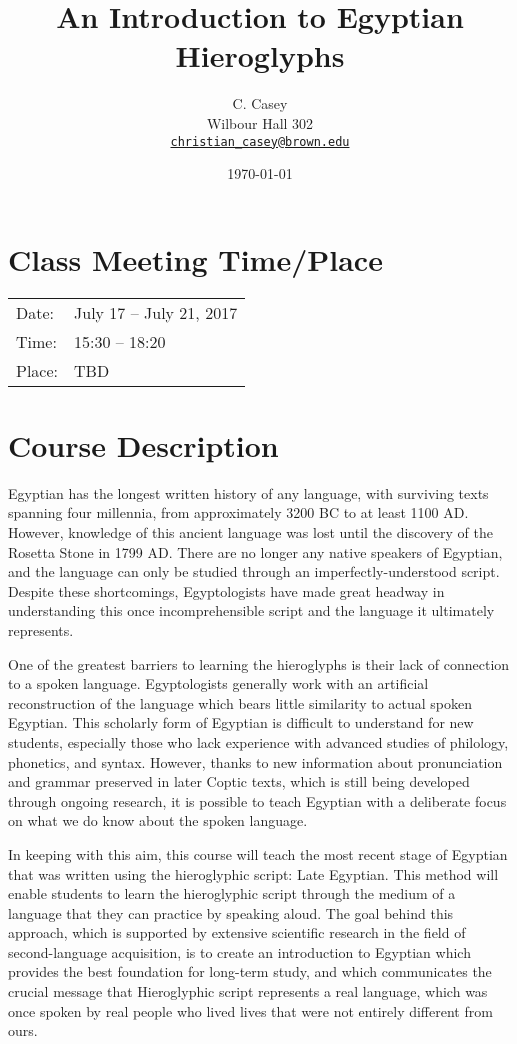 \documentclass[11pt]{article}
\begin{document}
	
	\title{An Introduction to Egyptian Hieroglyphs}
	\author{C. Casey \\
		Wilbour Hall 302 \\
  		\texttt{\href{mailto:christian_casey@brown.edu}{christian\_casey@brown.edu}}}
	\date{\today}
	\maketitle
	
	\section*{Class Meeting Time/Place}
	
		\begin{tabular}{l l}
		Date: & July 17 – July 21, 2017 \\
		Time: & 15:30 – 18:20 \\
		Place: & TBD
		\end{tabular} 
		
	\section*{Course Description}
		Egyptian has the longest written history of any language, with surviving texts spanning four millennia, from approximately 3200 BC to at least 1100 AD. However, knowledge of this ancient language was lost until the discovery of the Rosetta Stone in 1799 AD. There are no longer any native speakers of Egyptian, and the language can only be studied through an imperfectly-understood script. Despite these shortcomings, Egyptologists have made great headway in understanding this once incomprehensible script and the language it ultimately represents. 
	
		One of the greatest barriers to learning the hieroglyphs is their lack of connection to a spoken language. Egyptologists generally work with an artificial reconstruction of the language which bears little similarity to actual spoken Egyptian. This scholarly form of Egyptian is difficult to understand for new students, especially those who lack experience with advanced studies of philology, phonetics, and syntax. However, thanks to new information about pronunciation and grammar preserved in later Coptic texts, which is still being developed through ongoing research, it is possible to teach Egyptian with a deliberate focus on what we do know about the spoken language. 
	
		In keeping with this aim, this course will teach the most recent stage of Egyptian that was written using the hieroglyphic script: Late Egyptian. This method will enable students to learn the hieroglyphic script through the medium of a language that they can practice by speaking aloud. The goal behind this approach, which is supported by extensive scientific research in the field of second-language acquisition, is to create an introduction to Egyptian which provides the best foundation for long-term study, and which communicates the crucial message that Hieroglyphic script represents a real language, which was once spoken by real people who lived lives that were not entirely different from ours. 
			
\end{document}

